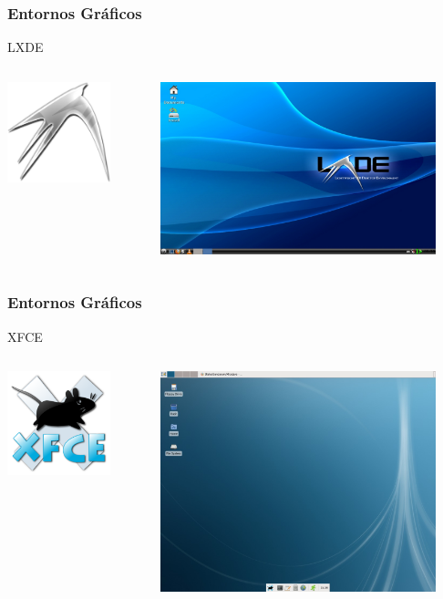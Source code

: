 \frame
{
\frametitle{Entornos Gráficos}
\Large{LXDE}
\begin{columns}
	\begin{column}{0.2\textwidth}
		\includegraphics[width=3cm]{img/lxde-logo}
	\end{column}
	\begin{column}{0.8\textwidth}
		\begin{center}
			\includegraphics[width=8cm]{img/lxde}
		\end{center}
	\end{column}
\end{columns}
}

\frame
{
\frametitle{Entornos Gráficos}
\Large{XFCE}
\begin{columns}
	\begin{column}{0.2\textwidth}
		\includegraphics[width=3cm]{img/xfce-logo}
	\end{column}
	\begin{column}{0.8\textwidth}
		\begin{center}
			\includegraphics[width=8cm]{img/xfce}
		\end{center}
	\end{column}
\end{columns}
}

